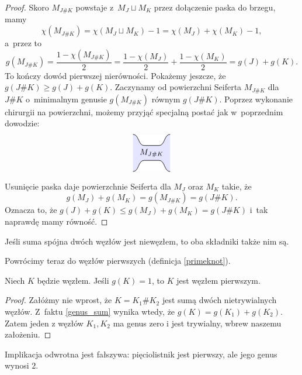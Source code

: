 \begin{proof}
    Skoro $M_{J\#K}$ powstaje z~$M_J \sqcup M_K$ przez dołączenie paska do brzegu, mamy
    \[
        \chi(M_{J\#K}) = \chi(M_J \sqcup M_K) - 1 = \chi(M_J) + \chi(M_K)-1,
    \]
    a~przez to
    \[
        g(M_{J\#K}) = \frac{1-\chi(M_{J\#K})}{2} =
        \frac{1-\chi(M_{J})}{2} + \frac{1-\chi(M_{K})}{2}
        = g(J) + g(K).
    \]
    To kończy dowód pierwszej nierówności.
    Pokażemy jeszcze, że $g(J \# K) \ge g(J)+g(K)$.
    Zaczynamy od powierzchni Seiferta $M_{J\#K}$ dla $J\#K$ o~minimalnym genusie $g(M_{J\#K})$ równym $g(J\#K)$.
    Poprzez wykonanie chirurgii na powierzchni, możemy przyjąć specjalną postać jak w~poprzednim dowodzie:
    \[
        \begin{tikzpicture}[baseline=-0.65ex,scale=0.16]
            \fill[blue!10!white] (-5, -5) rectangle(5, 5);
        \draw[semithick,fill=white] (-5, -5) to [out=right, in=left] (-2, -2) -- (2, -2) to [out=right, in=left] (5, -5);
        \draw[semithick,fill=white] (-5,  5) to [out=right, in=left] (-2,  2) -- (2,  2) to [out=right, in=left] (5,  5);
            \node at (0, 0) {$M_{J \# K}$};
        \end{tikzpicture}
    \]

    Usunięcie paska daje powierzchnie Seiferta dla $M_J$ oraz $M_K$ takie, że
    \[
        g(M_J)+g(M_K)=g(M_{J\#K})=g(J\#K).
    \]
    Oznacza to, że $g(J)+g(K)\leqslant g(M_J)+g(M_K)=g(J\#K)$ i~tak naprawdę mamy równość.
\end{proof}

\begin{corollary}
\label{no_inverses}
    Jeśli suma spójna dwóch węzłów jest niewęzłem, to oba składniki także nim są.
\end{corollary}

Powrócimy teraz do węzłów pierwszych (definicja \ref{primeknot}).

\begin{proposition}
    Niech $K$ będzie węzłem.
    Jeśli $g(K) = 1$, to $K$ jest węzłem pierwszym.
\end{proposition}

\begin{proof}
    Załóżmy nie wprost, że $K = K_1 \# K_2$ jest sumą dwóch nietrywialnych węzłów.
    Z~faktu \ref{genus_sum} wynika wtedy, że $g(K) = g(K_1) + g(K_2)$.
    Zatem jeden z węzłów $K_1, K_2$ ma genus zero i jest trywialny, wbrew naszemu założeniu.
\end{proof}

Implikacja odwrotna jest fałszywa: pięciolistnik jest pierwszy, ale jego genus wynosi $2$.

